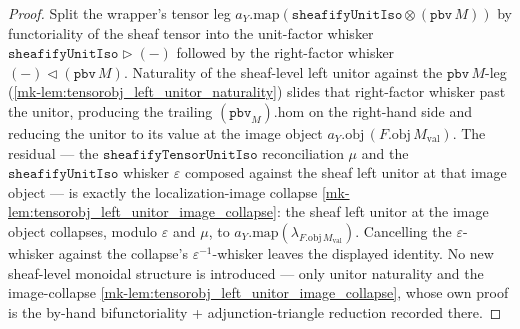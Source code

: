 \begin{proof}
  \leanok
  Split the wrapper's tensor leg \(a_Y.\mathrm{map}(\mathtt{sheafifyUnitIso} \otimes (\mathtt{pbv}\,M))\)
  by functoriality of the sheaf tensor into the unit-factor whisker
  \(\mathtt{sheafifyUnitIso} \rhd (-)\) followed by the right-factor whisker
  \((-) \lhd (\mathtt{pbv}\,M)\). Naturality of the sheaf-level left unitor against the
  \(\mathtt{pbv}\,M\)-leg (\ref{mk-lem:tensorobj_left_unitor_naturality}) slides that right-factor whisker
  past the unitor, producing the trailing \((\mathtt{pbv}_{M}).\mathrm{hom}\) on the right-hand side and
  reducing the unitor to its value at the image object
  \(a_Y.\mathrm{obj}\,(F.\mathrm{obj}\,M_{\mathrm{val}})\). The residual --- the
  \(\mathtt{sheafifyTensorUnitIso}\) reconciliation \(\mu\) and the \(\mathtt{sheafifyUnitIso}\)
  whisker \(\varepsilon\) composed against the sheaf left unitor at that image object --- is exactly the
  localization-image collapse \ref{mk-lem:tensorobj_left_unitor_image_collapse}: the sheaf left unitor at
  the image object collapses, modulo \(\varepsilon\) and \(\mu\), to
  \(a_Y.\mathrm{map}(\lambda_{F.\mathrm{obj}\,M_{\mathrm{val}}})\). Cancelling the
  \(\varepsilon\)-whisker against the collapse's \(\varepsilon^{-1}\)-whisker leaves the displayed
  identity. No new sheaf-level monoidal structure is introduced --- only unitor naturality and the
  image-collapse \ref{mk-lem:tensorobj_left_unitor_image_collapse}, whose own proof is the by-hand
  bifunctoriality + adjunction-triangle reduction recorded there.
\end{proof}


